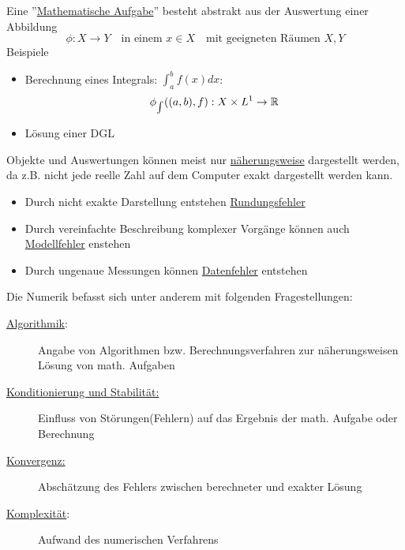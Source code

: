 
%

%

Eine ''\underline{Mathematische Aufgabe}'' besteht abstrakt aus der 
Auswertung einer Abbildung \[
    \phi: X\to Y\quad\text{in einem $x\in X$}\quad \text{mit geeigneten Räumen }X,Y
\]
Beispiele \begin{itemize}
    \item Berechnung eines Integrals: $\int_a^b f(x)dx$: \[
    \phi_{\int}((a,b), f): X\times L^1\to \mathbb{R} 
    \]
    \item Lösung einer DGL 
\end{itemize}
Objekte und Auswertungen können meist nur \underline{näherungsweise} dargestellt werden, da z.B. 
nicht jede reelle Zahl auf dem Computer exakt dargestellt werden kann. 
\begin{itemize}
    \item Durch nicht exakte Darstellung entstehen \underline{Rundungsfehler}
    \item Durch vereinfachte Beschreibung komplexer Vorgänge können auch \underline{Modellfehler} 
    enstehen
    \item Durch ungenaue Messungen können \underline{Datenfehler} entstehen
\end{itemize}
Die Numerik befasst sich unter anderem mit folgenden Fragestellungen:\begin{description}
    \item[\underline{Algorithmik}:] Angabe von Algorithmen bzw. Berechnungsverfahren zur näherungsweisen
    Lösung von math. Aufgaben
    \item[\underline{Konditionierung und Stabilität:}] Einfluss von Störungen(Fehlern) auf das Ergebnis
    der math. Aufgabe oder Berechnung
    \item[\underline{Konvergenz:}] Abschätzung des Fehlers zwischen berechneter und exakter Lösung
    \item[\underline{Komplexität}:] Aufwand des numerischen Verfahrens
\end{description} 
